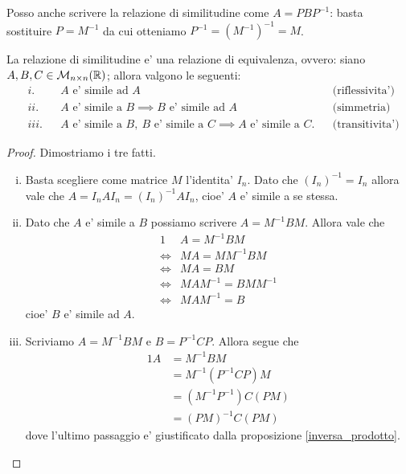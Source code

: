 \begin{remark}
    Posso anche scrivere la relazione di similitudine come $A = PBP^{-1}$: basta sostituire $P = M^{-1}$ da cui otteniamo $P^{-1} = (M^{-1})^{-1} = M$.
\end{remark}
\begin{proposition}
    La relazione di similitudine e' una relazione di equivalenza, ovvero: siano $A, B, C \in \mathcal{M}_{n \times n}(\mathbb{R})$; allora valgono le seguenti:
    \begin{align*}
        &i.     &&A \text{ e' simile ad } A  &&\text{(riflessivita')}\\
        &ii.    &&A \text{ e' simile a } B \implies B \text{ e' simile ad } A  &&\text{(simmetria)}\\
        &iii.   &&A \text{ e' simile a } B,\ B \text{ e' simile a } C \implies A \text{ e' simile a } C.   &&\text{(transitivita')}
    \end{align*}
\end{proposition}
\begin{proof}
    Dimostriamo i tre fatti.
    \begin{enumerate}[(i)]
        \item Basta scegliere come matrice $M$ l'identita' $I_n$. Dato che $(I_n)^{-1} = I_n$ allora vale che $A = I_nAI_n = (I_n)^{-1}AI_n$, cioe' $A$ e' simile a se stessa.
        \item Dato che $A$ e' simile a $B$ possiamo scrivere $A = M^{-1}BM$. Allora vale che \begin{alignat*}{1}
            &A = M^{-1}BM\\
            \iff &MA = MM^{-1}BM \\
            \iff &MA = BM \\
            \iff &MAM^{-1} = BMM^{-1} \\
            \iff &MAM^{-1} = B
        \end{alignat*}
        cioe' $B$ e' simile ad $A$.
        \item Scriviamo $A = M^{-1}BM$ e $B = P^{-1}CP$. Allora segue che \begin{alignat*}
            {1}
            A &= M^{-1}BM\\
            &= M^{-1}(P^{-1}CP)M \\
            &= (M^{-1}P^{-1})C(PM) \\
            &= (PM)^{-1}C(PM)
        \end{alignat*}
        dove l'ultimo passaggio e' giustificato dalla proposizione \ref{inversa_prodotto}. \qedhere
    \end{enumerate}
\end{proof}

